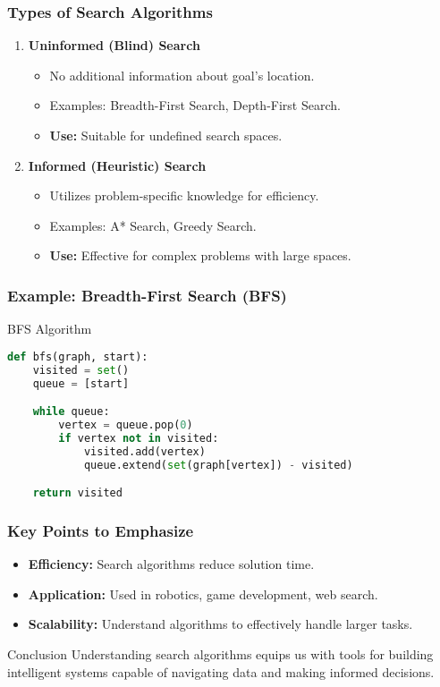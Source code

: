 \documentclass[aspectratio=169]{beamer}
\begin{document}
\begin{frame}[fragile]
    \frametitle{Types of Search Algorithms}
    \begin{enumerate}
        \item \textbf{Uninformed (Blind) Search}
            \begin{itemize}
                \item No additional information about goal's location.
                \item Examples: Breadth-First Search, Depth-First Search.
                \item \textbf{Use:} Suitable for undefined search spaces.
            \end{itemize}

        \item \textbf{Informed (Heuristic) Search}
            \begin{itemize}
                \item Utilizes problem-specific knowledge for efficiency.
                \item Examples: A* Search, Greedy Search.
                \item \textbf{Use:} Effective for complex problems with large spaces.
            \end{itemize}
    \end{enumerate}
\end{frame}

\begin{frame}[fragile]
    \frametitle{Example: Breadth-First Search (BFS)}
    \begin{block}{BFS Algorithm}
    \begin{lstlisting}[language=Python]
def bfs(graph, start):
    visited = set()
    queue = [start]

    while queue:
        vertex = queue.pop(0)
        if vertex not in visited:
            visited.add(vertex)
            queue.extend(set(graph[vertex]) - visited)

    return visited
    \end{lstlisting}
    \end{block}
\end{frame}

\begin{frame}[fragile]
    \frametitle{Key Points to Emphasize}
    \begin{itemize}
        \item \textbf{Efficiency:} Search algorithms reduce solution time.
        \item \textbf{Application:} Used in robotics, game development, web search.
        \item \textbf{Scalability:} Understand algorithms to effectively handle larger tasks.
    \end{itemize}
    
    \begin{block}{Conclusion}
        Understanding search algorithms equips us with tools for building intelligent systems capable of navigating data and making informed decisions.
    \end{block}
\end{frame}
\end{document}
